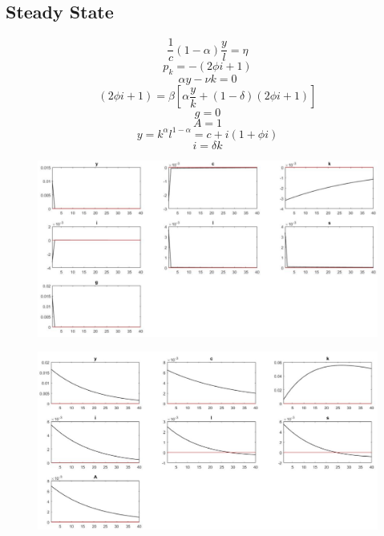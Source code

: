 \documentclass{article}
\begin{document}
\subsection{Steady State}
\begin{equation}
	\frac{1}{c}(1 - \alpha)\frac{y}{l} = \eta
\end{equation}
\begin{equation}
	p_k = -(2\phi i+1)
\end{equation}
\begin{equation}
	\alpha y - \nu k = 0
\end{equation}
\begin{equation}
	(2\phi i+1) = \beta \left[ \alpha \frac{y}{k} + (1-\delta)(2\phi i+1) \right]
\end{equation}
\begin{equation}
	g = 0
\end{equation}
\begin{equation}
	A = 1
\end{equation}
\begin{equation}
	y = k^\alpha l^{1-\alpha} = c + i(1+\phi i)
\end{equation}
\begin{equation}
	i = \delta k
\end{equation}
\newpage
\begin{figure}[h]
	\centering
	\includegraphics[width=1.2\linewidth]{shockgasto}
	\label{fig:a}
\end{figure}
\begin{figure}[h]
	\centering
	\includegraphics[width=1.2\linewidth]{schocktec2}
	\label{fig:a}
\end{figure}
\end{document}
